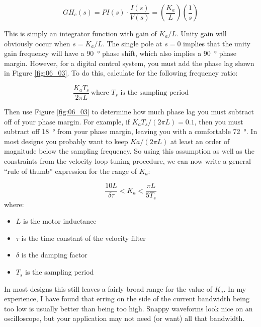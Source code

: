 \begin{equation} \label{eq:6_2}
    GH_c(s) = PI(s) \cdot \frac{I(s)}{V(s)} = \left(\frac{K_a}L\right)\left(\frac1s\right)
\end{equation}

This is simply an integrator function with gain of $K_a/L$.  Unity gain will obviously occur when $s = K_a/L$.  The single pole at $s = 0$ implies that the unity gain frequency will have a \qty{90}{\degree} phase shift, which also implies a \qty{90}{\degree} phase margin.  However, for a digital control system, you must add the phase lag shown in Figure \ref{fig:06_03}.  To do this, calculate for the following frequency ratio:

\begin{equation} \label{eq:6_3}
    \frac{K_a T_s}{2\pi L}\,\text{where $T_s$ is the sampling period}
\end{equation}

Then use Figure \ref{fig:06_03} to determine how much phase lag you must subtract off of your phase margin.  For example, if $K_aT_s/(2\pi L) = 0.1$, then you must subtract off \qty{18}{\degree} from your phase margin, leaving you with a comfortable \qty{72}{\degree}.  In most designs you probably want to keep $Ka/(2\pi L)$ at least an order of magnitude below the sampling frequency.  So using this assumption as well as the constraints from the velocity loop tuning procedure, we can now write a general “rule of thumb” expression for the range of $K_a$:

\begin{equation}\label{eq:6_4}
    \frac{10L}{\delta \tau} < K_a < \frac{\pi L}{5 T_s}
\end{equation}
where:
\begin{itemize}
    \item $L$ is the motor inductance
    \item $\tau$ is the time constant of the velocity filter
    \item $\delta$ is the damping factor
    \item $T_s$ is the sampling period
\end{itemize}


In most designs this still leaves a fairly broad range for the value of $K_a$.  In my experience, I have found that erring on the side of the current bandwidth being too low is usually better than being too high.  Snappy waveforms look nice on an oscilloscope, but your application may not need (or want) all that bandwidth.

